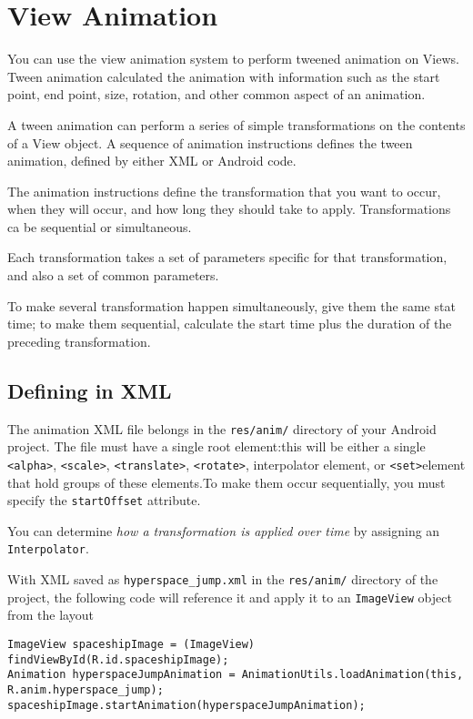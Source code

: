 \documentclass[11pt, a4paper]{book}
\begin{document}
\chapter{View Animation}
You can use the view animation system to perform tweened animation on Views.
Tween animation calculated the animation with information such as the start
point, end point, size, rotation, and other common aspect of an animation.

A tween animation can perform a series of simple transformations on the contents
of a View object. A sequence of animation instructions defines the tween
animation, defined by either XML or Android code.  

The animation instructions define the transformation that you want to occur,
when they will occur, and how long they should take to apply. Transformations ca
be sequential or simultaneous.

Each transformation takes a set of parameters specific for that transformation,
and also a set of common parameters.

To make several transformation happen simultaneously, give them the same stat
time; to make them sequential, calculate the start time plus the duration of the
preceding transformation.

\section{Defining in XML}
The animation XML file belongs in the \verb|res/anim/| directory of your Android
project. The file must have a single root element:this will be either a single
\verb|<alpha>|, \verb|<scale>|, \verb|<translate>|, \verb|<rotate>|,
interpolator element, or \verb|<set>|element that hold groups of these
elements.To make them occur sequentially, you must specify the
\verb|startOffset| attribute.

You can determine \emph{how a transformation is applied over time} by assigning
an \verb|Interpolator|.

With XML saved as \verb|hyperspace_jump.xml| in the \verb|res/anim/| directory
of the project, the following code will reference it and apply it to an
\verb|ImageView| object from the layout
\begin{verbatim}
ImageView spaceshipImage = (ImageView) findViewById(R.id.spaceshipImage);
Animation hyperspaceJumpAnimation = AnimationUtils.loadAnimation(this, R.anim.hyperspace_jump);
spaceshipImage.startAnimation(hyperspaceJumpAnimation);
\end{verbatim}
\end{document}
